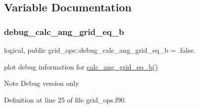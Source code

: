 \subsection{Variable Documentation}
\mbox{\label{namespacegrid__ops_ad043ab1b07b2d251bb7596b8c8d2f960}} 
\subsubsection{\texorpdfstring{debug\+\_\+calc\+\_\+ang\+\_\+grid\+\_\+eq\+\_\+b}{debug\_calc\_ang\_grid\_eq\_b}}
{\footnotesize\ttfamily logical, public grid\+\_\+ops\+::debug\+\_\+calc\+\_\+ang\+\_\+grid\+\_\+eq\+\_\+b = .false.}



plot debug information for \hyperlink{namespacegrid__ops_a06107dbdfd1dd62e372cc29ab0255bad}{calc\+\_\+ang\+\_\+grid\+\_\+eq\+\_\+b()} 

\begin{DoxyNote}{Note}
Debug version only 
\end{DoxyNote}


Definition at line 25 of file grid\+\_\+ops.\+f90.

